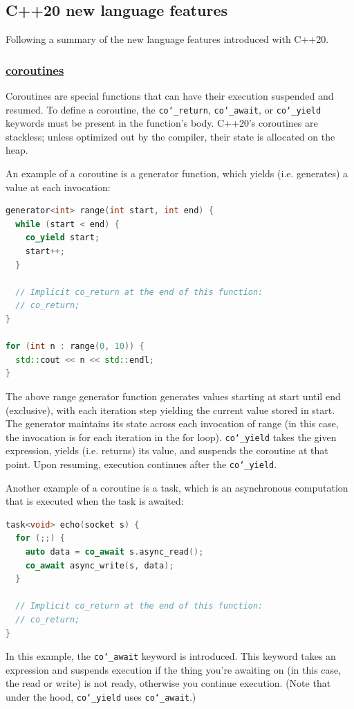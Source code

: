 \newpage
\subsection{C++20 new language features}
Following a summary of the new language features introduced with C++20.
\subsubsection{\href{https://github.com/AnthonyCalandra/modern-cpp-features/tree/master\#coroutines}
                    {coroutines}}
Coroutines are special functions that can have their execution suspended 
and resumed. To define a coroutine, the \texttt{co\char`_return}, \texttt{co\char`_await}, 
or \texttt{co\char`_yield} keywords must be present in the function's body. 
C++20's coroutines are stackless; unless optimized out by the compiler, 
their state is allocated on the heap.

An example of a coroutine is a generator function, which yields (i.e. generates) 
a value at each invocation:
\begin{lstlisting}[language=C++]
generator<int> range(int start, int end) {
  while (start < end) {
    co_yield start;
    start++;
  }

  // Implicit co_return at the end of this function:
  // co_return;
}

for (int n : range(0, 10)) {
  std::cout << n << std::endl;
}
\end{lstlisting}

The above range generator function generates values starting at start 
until end (exclusive), with each iteration step yielding the current 
value stored in start. The generator maintains its state across each 
invocation of range (in this case, the invocation is for each iteration 
in the for loop). \texttt{co\char`_yield} takes the given expression, yields (i.e. returns) 
its value, and suspends the coroutine at that point. Upon resuming, 
execution continues after the \texttt{co\char`_yield}.

Another example of a coroutine is a task, which is an asynchronous computation 
that is executed when the task is awaited:
\begin{lstlisting}[language=C++]
task<void> echo(socket s) {
  for (;;) {
    auto data = co_await s.async_read();
    co_await async_write(s, data);
  }

  // Implicit co_return at the end of this function:
  // co_return;
}
\end{lstlisting}
In this example, the \texttt{co\char`_await} keyword is introduced. 
This keyword takes an expression and suspends execution if the thing 
you're awaiting on (in this case, the read or write) is not ready, 
otherwise you continue execution. (Note that under the hood, 
\texttt{co\char`_yield} uses \texttt{co\char`_await}.)

